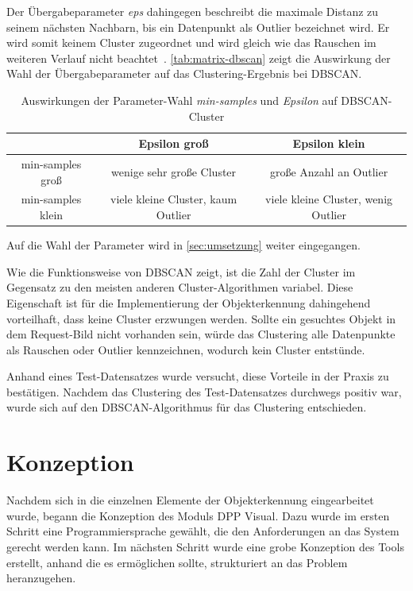 \documentclass[
    type=Prakikumsbericht,
    status=draft, %
    language=german, %
    bibengine=bibtex,
]{unibwm-inf-thesis}
\begin{document}
    Der Übergabeparameter \textit{eps} dahingegen beschreibt die maximale Distanz zu seinem nächsten Nachbarn, bis ein Datenpunkt als Outlier bezeichnet wird.
    Er wird somit keinem Cluster zugeordnet und wird gleich wie das Rauschen im weiteren Verlauf nicht beachtet~\citep{Bedre2022}.
    \autoref{tab:matrix-dbscan} zeigt die Auswirkung der Wahl der Übergabeparameter auf das Clustering-Ergebnis bei \ac{DBSCAN}.
    \begin{table}[h]
        \centering
        \begin{tabular}{c | c | c}
            & Epsilon groß & Epsilon klein \\ \hline
            min-samples groß & wenige sehr große Cluster & große Anzahl an Outlier\\ \hline
            min-samples klein & viele kleine Cluster, kaum Outlier & viele kleine Cluster, wenig Outlier
        \end{tabular}
        \caption{Auswirkungen der Parameter-Wahl \textit{min-samples} und \textit{Epsilon} auf \ac{DBSCAN}-Cluster}
        \label{tab:matrix-dbscan}
    \end{table}

    Auf die Wahl der Parameter wird in \autoref{sec:umsetzung} weiter eingegangen.

    Wie die Funktionsweise von \ac{DBSCAN} zeigt, ist die Zahl der Cluster im Gegensatz zu den meisten anderen Cluster-Algorithmen variabel.
    Diese Eigenschaft ist für die Implementierung der Objekterkennung dahingehend vorteilhaft, dass keine Cluster \glqq erzwungen\grqq{} werden.
    Sollte ein gesuchtes Objekt in dem Request-Bild nicht vorhanden sein, würde das Clustering alle Datenpunkte als Rauschen oder Outlier kennzeichnen, wodurch kein Cluster entstünde.

    Anhand eines Test-Datensatzes wurde versucht, diese Vorteile in der Praxis zu bestätigen.
    Nachdem das Clustering des Test-Datensatzes durchwegs positiv war, wurde sich auf den \ac{DBSCAN}-Algorithmus für das Clustering entschieden.

    
    \section{Konzeption}
    Nachdem sich in die einzelnen Elemente der Objekterkennung eingearbeitet wurde, begann die Konzeption des Moduls \ac{DPP} Visual.
    Dazu wurde im ersten Schritt eine Programmiersprache gewählt, die den Anforderungen an das System gerecht werden kann.
    Im nächsten Schritt wurde eine grobe Konzeption des Tools erstellt, anhand die es ermöglichen sollte, strukturiert an das Problem heranzugehen.
\end{document}

